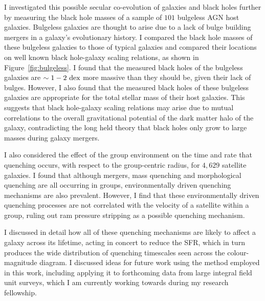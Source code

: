 \documentclass[12pt]{article}
\begin{document}
I investigated this possible secular co-evolution of galaxies and black holes further by measuring the black hole masses of a sample of $101$ bulgeless AGN host galaxies. Bulgeless galaxies are thought to arise due to a lack of bulge building mergers in a galaxy's evolutionary history. I compared the black hole masses of these bulgeless galaxies to those of typical galaxies and compared their locations on well known black hole-galaxy scaling relations, as shown in Figure~\ref{fig:bulgeless}. I found that the measured black holes of the bulgeless galaxies are $\sim1-2~\rm{dex}$ more massive than they should be, given their lack of bulges. However, I also found that the measured black holes of these bulgeless galaxies are appropriate for the total stellar mass of their host galaxies. This suggests that black hole-galaxy scaling relations may arise due to mutual correlations to the overall gravitational potential of the dark matter halo of the galaxy, contradicting the long held theory that black holes only grow to large masses during galaxy mergers. 

I also considered the effect of the group environment on the time and rate that quenching occurs, with respect to the group-centric radius, for $4,629$ satellite galaxies. I found that although mergers, mass quenching and morphological quenching are all occurring in groups, environmentally driven quenching mechanisms are also prevalent. However, I find that these environmentally driven quenching processes are not correlated with the velocity of a satellite within a group, ruling out ram pressure stripping as a possible quenching mechanism. 

I discussed in detail how all of these quenching mechanisms are likely to affect a galaxy across its lifetime, acting in concert to reduce the SFR, which in turn produces the wide distribution of quenching timescales seen across the colour-magnitude diagram. I discussed ideas for future work using the method employed in this work, including applying it to forthcoming data from large integral field unit surveys, which I am currently working towards during my research fellowship. 
\end{document}
